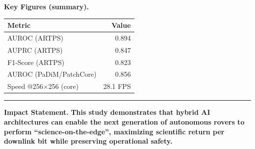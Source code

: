 \documentclass[10pt,a4paper]{article}
\newcommand{\blocktitle}[1]{\textbf{\textcolor{iacBlue}{#1}}}
\begin{document}
\begin{minipage}[t]{0.38\linewidth}
\vspace{-2pt}

\vspace{6pt}
\blocktitle{Key Figures (summary).}\par
\vspace{3pt}
\begin{tabularx}{\linewidth}{>{\raggedright\arraybackslash}X r}
\toprule
\textbf{Metric} & \textbf{Value} \\
\midrule
AUROC (ARTPS) & 0.894 \\
AUPRC (ARTPS) & 0.847 \\
F1-Score (ARTPS) & 0.823 \\
AUROC (PaDiM/PatchCore) & 0.856 \\
Speed @256\(\times\)256 (core) & 28.1 FPS \\
\bottomrule
\end{tabularx}
\end{minipage}

\vspace{10pt}
\hrule
\vspace{8pt}
\textbf{Impact Statement.}\;
\textbf{This study demonstrates that hybrid AI architectures can enable the next generation of autonomous rovers to perform ``science-on-the-edge'', maximizing scientific return per downlink bit while preserving operational safety.}
\end{document}
